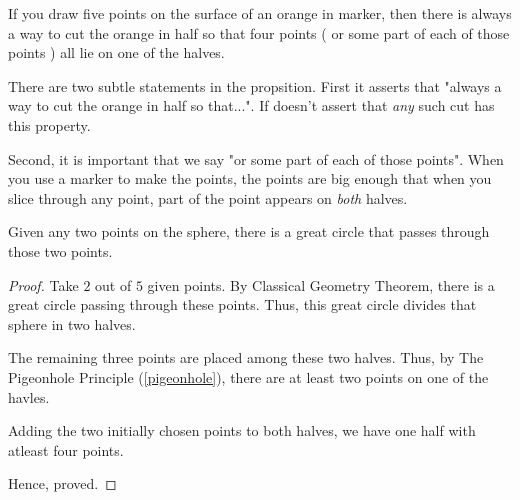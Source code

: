 \begin{proposition}
  If you draw five points on the surface of an orange in marker, then there is always a way to cut the orange in half so that four points ( or some part of each of those points ) all lie on one of the halves.
\end{proposition}

\begin{scratch}
There are two subtle statements in the propsition. First it asserts that "always a way to cut the orange in half so that...".
If doesn't assert that \emph{any} such cut has this property.

Second, it is important that we say "or some part of each of those points". When you use a marker to make the points, the points are big enough that when you slice through any point, part of the point appears on \emph{both} halves.
\end{scratch}

\begin{named}
  Given any two points on the sphere, there is a great circle that passes through those two points.
\end{named}


\begin{proof}
  Take $2$ out of $5$ given points. By Classical Geometry Theorem, there is a great circle passing through these points. Thus, this great circle divides that sphere in two halves.

  The remaining three points are placed among these two halves. Thus, by The Pigeonhole Principle (\ref{pigeonhole}), there are at least two points on one of the havles.

  Adding the two initially chosen points to both halves, we have one half with atleast four points.

  Hence, proved.
\end{proof}
